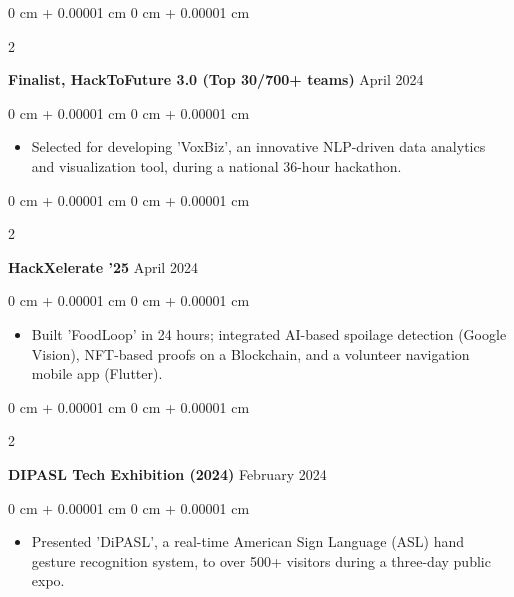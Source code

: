 \documentclass[10pt, letterpaper]{article}
\newenvironment{highlights}{
    \begin{itemize}[
        topsep=0.10 cm,
        parsep=0.10 cm,
        partopsep=0pt,
        itemsep=0pt,
        leftmargin=0 cm + 10pt
    ]
}{
    \end{itemize}
} %
\newenvironment{onecolentry}{
    \begin{adjustwidth}{
        0 cm + 0.00001 cm
    }{
        0 cm + 0.00001 cm
    }
}{
    \end{adjustwidth}
} %
\newenvironment{twocolentry}[2][]{
    \onecolentry
    \def\secondColumn{#2}
    \setcolumnwidth{\fill, 4.5 cm}
    \begin{paracol}{2}
}{
    \switchcolumn \raggedleft \secondColumn
    \end{paracol}
    \endonecolentry
} %
\begin{document}
        \begin{twocolentry}{
            April 2024
        }
            \textbf{Finalist, HackToFuture 3.0 (Top 30/700+ teams)}\end{twocolentry}
        \vspace{0.05 cm}
        \begin{onecolentry}
            \begin{highlights}
                \item Selected for developing 'VoxBiz', an innovative NLP-driven data analytics and visualization tool, during a national 36-hour hackathon.
            \end{highlights}
        \end{onecolentry}

        \vspace{0.2 cm}

        \begin{twocolentry}{
            April 2024
        }
            \textbf{HackXelerate '25}\end{twocolentry}
        \vspace{0.05 cm}
        \begin{onecolentry}
            \begin{highlights}
                \item Built 'FoodLoop' in 24 hours; integrated AI-based spoilage detection (Google Vision), NFT-based proofs on a Blockchain, and a volunteer navigation mobile app (Flutter).
            \end{highlights}
        \end{onecolentry}

        \vspace{0.2 cm}

        \begin{twocolentry}{
             February 2024
        }
            \textbf{DIPASL Tech Exhibition (2024)}\end{twocolentry}
        \vspace{0.05 cm}
        \begin{onecolentry}
            \begin{highlights}
                \item Presented 'DiPASL', a real-time American Sign Language (ASL) hand gesture recognition system, to over 500+ visitors during a three-day public expo.
            \end{highlights}
        \end{onecolentry}
\end{document}
